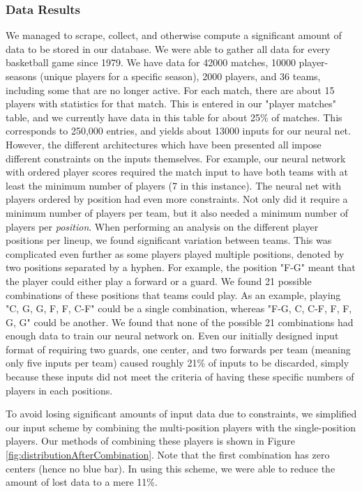 \subsubsection{Data Results}
We managed to scrape, collect, and otherwise compute a significant amount of data to be stored in our database. We were able to gather all data for every basketball game since 1979. We have data for 42000 matches, 10000 player-seasons (unique players for a specific season), 2000 players, and 36 teams, including some that are no longer active. For each match, there are about 15 players with statistics for that match. This is entered in our "player matches" table, and we currently have data in this table for about 25\% of matches. This corresponds to 250,000 entries, and yields about 13000 inputs for our neural net. However, the different architectures which have been presented all impose different constraints on the inputs themselves. For example, our neural network with ordered player scores required the match input to have both teams with at least the minimum number of players (7 in this instance). The neural net with players ordered by position had even more constraints. Not only did it require a minimum number of players per team, but it also needed a minimum number of players per \textit{position}. When performing an analysis on the different player positions per lineup, we found significant variation between teams. This was complicated even further as some players played multiple positions, denoted by two positions separated by a hyphen. For example, the position "F-G" meant that the player could either play a forward or a guard. We found 21 possible combinations of these positions that teams could play. As an example, playing "C, G, G, F, F, C-F" could be a single combination, whereas "F-G, C, C-F, F, F, G, G" could be another. We found that none of the possible 21 combinations had enough data to train our neural network on. Even our initially designed input format of requiring two guards, one center, and two forwards per team (meaning only five inputs per team) caused roughly 21\% of inputs to be discarded, simply because these inputs did not meet the criteria of having these specific numbers of players in each positions.

To avoid losing significant amounts of input data due to constraints, we simplified our input scheme by combining the multi-position players with the single-position players. Our methods of combining these players is shown in Figure \ref{fig:distributionAfterCombination}. Note that the first combination has zero centers (hence no blue bar). In using this scheme, we were able to reduce the amount of lost data to a mere 11\%.

